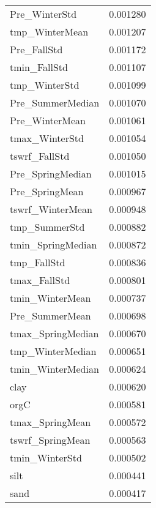 \begin{tabular}{lr}
Pre_WinterStd & 0.001280 \\
tmp_WinterMean & 0.001207 \\
Pre_FallStd & 0.001172 \\
tmin_FallStd & 0.001107 \\
tmp_WinterStd & 0.001099 \\
Pre_SummerMedian & 0.001070 \\
Pre_WinterMean & 0.001061 \\
tmax_WinterStd & 0.001054 \\
tswrf_FallStd & 0.001050 \\
Pre_SpringMedian & 0.001015 \\
Pre_SpringMean & 0.000967 \\
tswrf_WinterMean & 0.000948 \\
tmp_SummerStd & 0.000882 \\
tmin_SpringMedian & 0.000872 \\
tmp_FallStd & 0.000836 \\
tmax_FallStd & 0.000801 \\
tmin_WinterMean & 0.000737 \\
Pre_SummerMean & 0.000698 \\
tmax_SpringMedian & 0.000670 \\
tmp_WinterMedian & 0.000651 \\
tmin_WinterMedian & 0.000624 \\
clay & 0.000620 \\
orgC & 0.000581 \\
tmax_SpringMean & 0.000572 \\
tswrf_SpringMean & 0.000563 \\
tmin_WinterStd & 0.000502 \\
silt & 0.000441 \\
sand & 0.000417 \\
\bottomrule
\end{tabular}
